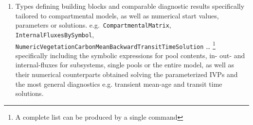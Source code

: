   \begin{enumerate}
    \item
      Types defining building blocks and comparable diagnostic results 
      specifically tailored to compartmental models, as well as numerical start values, parameters or solutions.
      e.g.\ \texttt{CompartmentalMatrix}, \texttt{InternalFluxesBySymbol},
      \texttt{NumericVegetationCarbonMeanBackwardTransitTimeSolution} \dots  
      \footnote{A complete list can be produced by a single command}
      specifically including the symbolic expressions for pool contents, in- out- and internal-fluxes for
      subsystems, single pools or the entire model, as well as their numerical counterparts obtained solving the parameterized IVPs and the most general diagnostics e.g. transient mean-age and transit time solutions.
      

\end{enumerate}
